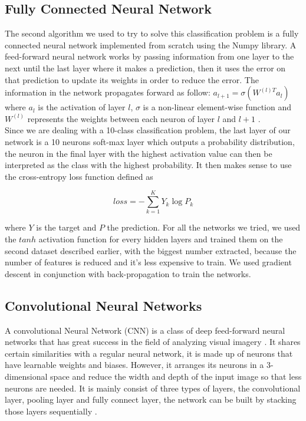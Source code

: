 \documentclass[letterpaper, 10 pt, conference]{ieeeconf}  %
\begin{document}
\subsection{Fully Connected Neural Network}
The second algorithm we used to try to solve this classification problem is a fully connected neural network implemented from scratch using the Numpy library. A feed-forward neural network works by passing information from one layer to the next until the last layer where it makes a prediction, then it uses the error on that prediction to update its weights in order to reduce the error. The information in the network propagates forward as follow: $a_{l+1} = \sigma (W^{(l)T}a_l)$ where $a_l$ is the activation of layer $l$, $\sigma$ is a non-linear element-wise function and $W^{(l)}$ represents the weights between each neuron of layer $l$ and $l+1$ \cite{goodfellow2016deep}. \\
Since we are dealing with a 10-class classification problem, the last layer of our network is a 10 neurons soft-max layer which outputs a probability distribution, the neuron in the final layer with the highest activation value can then be interpreted as the class with the highest probability. It then makes sense to use the cross-entropy loss function defined as
\begin{center}
$$loss = - \sum_{k=1}^{K}Y_k \log{P_k}$$
\end{center}
where $Y$ is the target and $P$ the prediction.
For all the networks we tried, we used the $tanh$ activation function for every hidden layers and trained them on the second dataset described earlier, with the biggest number extracted, because the number of features is reduced and it's less expensive to train. We used gradient descent in conjunction with back-propagation to train the networks.


\subsection{Convolutional Neural Networks}
A convolutional Neural Network (CNN) is a class of deep feed-forward neural networks that has great success in the field of analyzing visual imagery \cite{wiki:cnn}. It shares certain similarities with a regular neural network, it is made up of neurons that have learnable weights and biases. However, it arranges its neurons in a 3-dimensional space and reduce the width and depth of the input image so that less neurons are needed. It is mainly consist of three types of layers, the convolutional layer, pooling layer and fully connect layer, the network can be built by stacking those layers sequentially \cite{karpathycnn}. 
\end{document}
